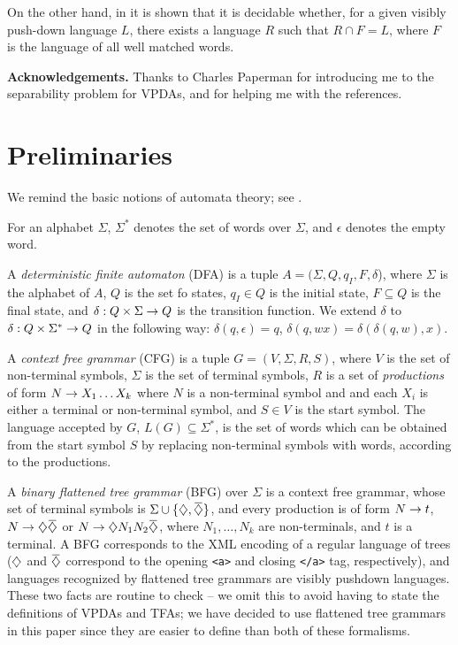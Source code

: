 \documentclass{article}
\begin{document}
On the other hand, in \cite{regvis} it is shown that it is decidable whether,
for a given visibly push-down language $L$, there exists a language $R$ such that
$R \cap F = L$, where $F$ is the language of all well matched words.

{\bf Acknowledgements.} Thanks to Charles Paperman for introducing me to
the separability problem for VPDAs, and for helping me with the references.

\section{Preliminaries}

We remind the basic notions of automata theory;  see \cite{hu79}.

For an alphabet $\Sigma$, $\Sigma^*$ denotes the set of words over $\Sigma$, and
$\epsilon$ denotes the empty word.

A \emph{deterministic finite automaton} (DFA) is a tuple $A = (\Sigma, Q, q_I, F, \delta$),
where $\Sigma$ is the alphabet of $A$, $Q$ is the set fo states, $q_I \in Q$ is the
initial state, $F \subseteq Q$ is the final state, and $\delta: Q \times \Sigma \rightarrow Q$
is the transition function. We extend $\delta$ to $\delta: Q \times \Sigma^* \rightarrow Q$
in the following way: $\delta(q,\epsilon) = q$, $\delta(q,wx) = \delta(\delta(q,w),x)$.

A \emph{context free grammar} (CFG) is a tuple $G = (V, \Sigma, R, S)$, where $V$ is the
set of non-terminal symbols, $\Sigma$ is the set of terminal symbols, $R$ is a set
of \emph{productions} of form $N \rightarrow X_1 \ldots X_k$ where $N$ is a non-terminal symbol
and and each $X_i$ is either a terminal or non-terminal symbol, and $S \in V$ is
the start symbol. The language accepted by $G$, $L(G) \subseteq \Sigma^*$, is the set of
words which can be obtained from the start symbol $S$ by replacing non-terminal symbols
with words, according to the productions.

A \emph{binary flattened tree grammar} (BFG) over $\Sigma$ is a context free grammar, whose
set of terminal symbols is $\Sigma \cup \{\oa, \ca\}$, and every production is 
of form $N \rightarrow t$, $N \ra \oa\ca$ or $N \ra \oa N_1 N_2 \ca$, where 
$N_1, \ldots, N_k$ are non-terminals, and $t$ is a terminal.
A BFG corresponds to the XML encoding of a 
regular language of trees ($\diamondsuit$ and $\ca$ correspond to the opening 
\verb:<a>: and closing \verb:</a>: tag, respectively), and languages recognized by
flattened tree grammars are visibly pushdown languages. These two facts are routine
to check -- we omit this to avoid having
to state the definitions of VPDAs and TFAs; we have decided to use flattened tree
grammars in this paper since they are easier to define than both of these formalisms.
\end{document}
